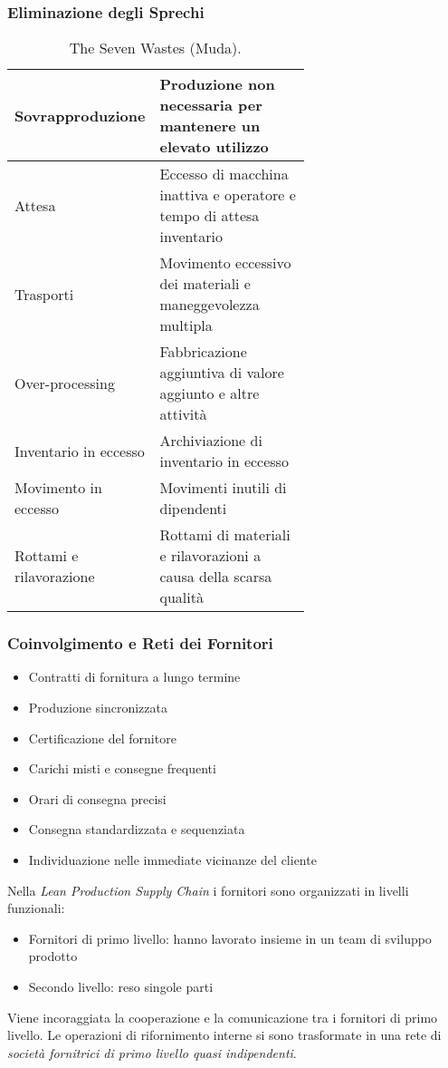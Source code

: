 \documentclass[a4paper,portrait,12pt]{article}
\theoremstyle{definition}
\begin{document}
\subsubsection{Eliminazione degli Sprechi}

\begin{table}[H]
\centering
\begin{tabular}{l|p{0.65\linewidth}}
Sovrapproduzione & Produzione non necessaria per mantenere un elevato utilizzo\\
\hline
Attesa & Eccesso di macchina inattiva e operatore e tempo di attesa inventario\\
\hline
Trasporti & Movimento eccessivo dei materiali e maneggevolezza multipla\\
\hline
Over-processing & Fabbricazione aggiuntiva di valore aggiunto e altre attività\\
\hline
Inventario in eccesso & Archiviazione di inventario in eccesso\\
\hline
Movimento in eccesso & Movimenti inutili di dipendenti\\
\hline
Rottami e rilavorazione & Rottami di materiali e rilavorazioni a causa della scarsa qualità
\end{tabular}
\caption{The Seven Wastes (Muda).}
\end{table}


\subsubsection{Coinvolgimento e Reti dei Fornitori}
\begin{itemize}
\item Contratti di fornitura a lungo termine
\item Produzione sincronizzata
\item Certificazione del fornitore
\item Carichi misti e consegne frequenti
\item Orari di consegna precisi
\item Consegna standardizzata e sequenziata
\item Individuazione nelle immediate vicinanze del cliente
\end{itemize}

Nella \emph{Lean Production Supply Chain} i fornitori sono organizzati in livelli funzionali:
\begin{itemize}
\item Fornitori di primo livello: hanno lavorato insieme in un team di sviluppo prodotto
\item Secondo livello: reso singole parti
\end{itemize}
Viene incoraggiata la cooperazione e la comunicazione tra i fornitori di primo livello.
Le operazioni di rifornimento interne si sono trasformate in una rete di \emph{società fornitrici di primo livello quasi indipendenti}.\\
\end{document}
